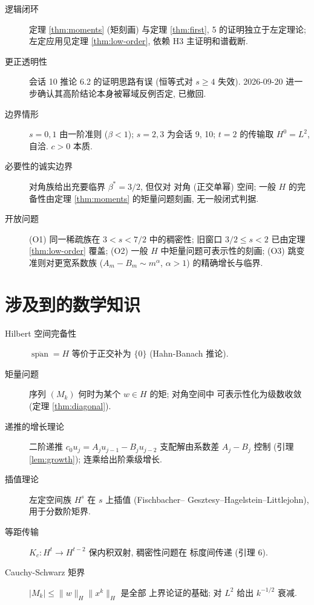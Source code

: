 \documentclass[UTF8]{ctexart}
\begin{document}
\begin{description}
	\item[逻辑闭环] 定理 \ref{thm:moments} (矩刻画) 与定理 \ref{thm:first}, 5 的证明独立于左定理论;
		左定应用见定理 \ref{thm:low-order}, 依赖 H3 主证明和谱截断.
	\item[更正透明性] 会话 10 推论 6.2 的证明思路有误 (恒等式对 $s \geq 4$
		失效). 2026-09-20 进一步确认其高阶结论本身被幂域反例否定, 已撤回.
	\item[边界情形] $s = 0, 1$ 由一阶准则 ($\beta < 1$); $s = 2, 3$
		为会话 9, 10; $t = 2$ 的传输取 $H^0 = L^2$, 自洽. $c > 0$ 本质.
	\item[必要性的诚实边界] 对角族给出充要临界 $\beta^* = 3/2$, 但仅对
		对角 (正交单幂) 空间; 一般 $H$ 的完备性由定理 \ref{thm:moments} 的矩量问题刻画,
		无一般闭式判据.
	\item[开放问题] (O1) 同一稀疏族在 $3<s<7/2$ 中的稠密性;
		旧窗口 $3/2\le s<2$ 已由定理 \ref{thm:low-order} 覆盖;
		(O2) 一般 $H$ 中矩量问题可表示性的刻画;
		(O3) 跳变准则对更宽系数族 ($A_m - B_m \sim m^\alpha$, $\alpha > 1$)
		的精确增长与临界.
\end{description}

\section{涉及到的数学知识}

\begin{description}
	\item[Hilbert 空间完备性] $\overline{\operatorname{span}} = H$
		等价于正交补为 $\{0\}$ (Hahn-Banach 推论).
	\item[矩量问题] 序列 $(M_k)$ 何时为某个 $w \in H$ 的矩; 对角空间中
		可表示性化为级数收敛 (定理 \ref{thm:diagonal}).
	\item[递推的增长理论] 二阶递推 $c_0 u_j = A_ju_{j-1} - B_ju_{j-2}$
		支配解由系数差 $A_j - B_j$ 控制 (引理 \ref{lem:growth}); 连乘给出阶乘级增长.
	\item[插值理论] 左定空间族 $H^s$ 在 $s$ 上插值 (Fischbacher--
		Gesztesy--Hagelstein--Littlejohn), 用于分数阶矩界.
	\item[等距传输] $K_c: H^t \to H^{t-2}$ 保内积双射, 稠密性问题在
		标度间传递 (引理 6).
	\item[Cauchy-Schwarz 矩界] $|M_k| \leq \|w\|_H \|x^k\|_H$ 是全部
		上界论证的基础; 对 $L^2$ 给出 $k^{-1/2}$ 衰减.
\end{description}
\end{document}
